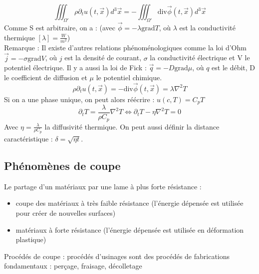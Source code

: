 \documentclass[../main.tex]{subfiles}
\begin{document}
\begin{equation}
    \iiint_{\Omega'} \rho \partial_t u(t,\Vec{x}) d^3\Vec{x} = - \iiint_{\Omega'} \text{div} \Vec{\phi}(t,\Vec{x}) d^3 \Vec{x}
\end{equation}
Comme S est arbitraire, on a : (avec $\Vec{\phi} = -\lambda \text{grad} T$, où $\lambda$ est la conductivité thermique $[\lambda] = \frac{W}{m^2}$)\\
\color{gray} Remarque : Il existe d'autres relations phénoménologiques comme la loi d'Ohm $\Vec{j} = - \sigma \text{grad}V$, où $j$ est la densité de courant, $\sigma$ la conductivité électrique et V le potentiel électrique. Il y a aussi la loi de Fick : $\Vec{q} = -D \text{grad} \mu$, où $q$ est le débit, D le coefficient de diffusion et $\mu$ le potentiel chimique.\color{black}\\
\begin{equation}
    \rho \partial_t u(t,\Vec{x}) = -\text{div} \Vec{\phi} (t,\vec{x}) = \lambda \nabla^2 T
\end{equation}
Si on a une phase unique, on peut alors réécrire : $u(c,T) = C_pT$\\

\begin{equation}
    \partial_t T = \frac{\lambda}{\rho C_p} \nabla^2T \Leftrightarrow \partial_t T - \eta \nabla^2T = 0
\end{equation}
Avec $\eta = \frac{\lambda}{\rho C_p}$ la diffusivité thermique. On peut aussi définir la distance caractéristique : $\delta = \sqrt{\eta t}$.\\

\subsection{Phénomènes de coupe}
Le partage d'un matériaux par une lame à plus forte résistance : \begin{itemize}
    \item coupe des matériaux à très faible résistance (l'énergie dépensée est utilisée pour créer de nouvelles surfaces)\\
    \item matériaux à forte résistance (l'énergie dépensée est utilisée en déformation plastique)\\
\end{itemize}

\quad Procédés de coupe : procédés d'usinages sont des procédés de fabrications fondamentaux : perçage, fraisage, décolletage\\
\end{document}
